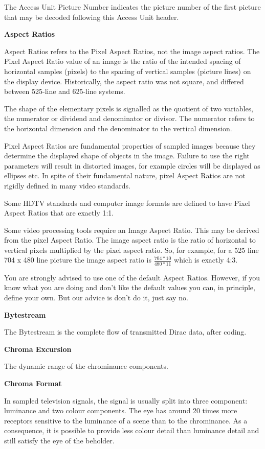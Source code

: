 The Access Unit Picture Number indicates the picture number of the first
picture that may be decoded following this Access Unit header.

\textbf{Aspect Ratios}

Aspect Ratios refers to the Pixel Aspect Ratios, not the image aspect
ratios. The Pixel Aspect Ratio value of an image is the ratio of the
intended spacing of horizontal samples (pixels) to the spacing of
vertical samples (picture lines) on the display device. Historically,
the aspect ratio was not square, and differed between 525-line and
625-line systems.

The shape of the elementary pixels is signalled as the quotient of two
variables, the numerator or dividend and denominator or divisor. The
numerator refers to the horizontal dimension and the denominator to the
vertical dimension.

Pixel Aspect Ratios are fundamental properties of sampled images because
they determine the displayed shape of objects in the image. Failure to
use the right parameters will result in distorted images, for example
circles will be displayed as ellipses etc. In spite of their fundamental
nature, pixel Aspect Ratios are not rigidly defined in many video
standards.

Some HDTV standards and computer image formats are defined to have Pixel
Aspect Ratios that are exactly 1:1.

Some video processing tools require an Image Aspect Ratio. This may be
derived from the pixel Aspect Ratio. The image aspect ratio is the ratio
of horizontal to vertical pixels multiplied by the pixel aspect ratio.
So, for example, for a 525 line 704 x 480 line picture the image aspect
ratio is $\frac{704 * 10}{480 * 11}$ which is exactly 4:3.

You are strongly advised to use one of the default Aspect Ratios.
However, if you know what you are doing and don't like the default
values you can, in principle, define your own. But our advice is don't
do it, just say no.

\textbf{Bytestream}

The Bytestream is the complete flow of transmitted Dirac data, after
coding.

\textbf{Chroma Excursion}

The dynamic range of the chrominance components.

\textbf{Chroma Format}

In sampled television signals, the signal is usually split into three
component: luminance and two colour components. The eye has around 20
times more receptors sensitive to the luminance of a scene than to the
chrominance. As a consequence, it is possible to provide less colour
detail than luminance detail and still satisfy the eye of the beholder.

